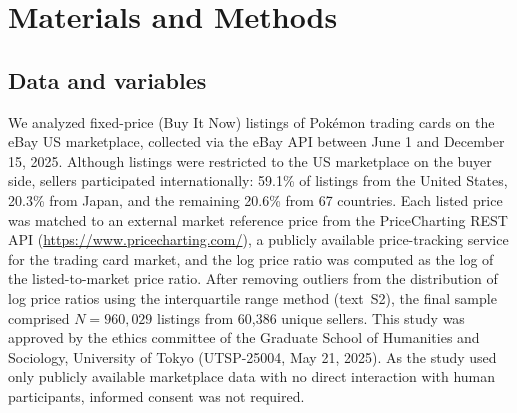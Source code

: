 \documentclass[11pt,letterpaper]{article}
\theoremstyle{definition}
\begin{document}
\section*{Materials and Methods}
\begingroup\sffamily\small\noindent

\subsection*{Data and variables}

We analyzed fixed-price (Buy It Now) listings of Pokémon trading cards on the eBay US marketplace, collected via the eBay API between June 1 and December 15, 2025. Although listings were restricted to the US marketplace on the buyer side, sellers participated internationally: 59.1\% of listings from the United States, 20.3\% from Japan, and the remaining 20.6\% from 67 countries. Each listed price was matched to an external market reference price from the PriceCharting REST API (\url{https://www.pricecharting.com/}), a publicly available price-tracking service for the trading card market, and the log price ratio was computed as the log of the listed-to-market price ratio. After removing outliers from the distribution of log price ratios using the interquartile range method (text~S2), the final sample comprised $N = 960{,}029$ listings from 60{,}386 unique sellers. This study was approved by the ethics committee of the Graduate School of Humanities and Sociology, University of Tokyo (UTSP-25004, May 21, 2025). As the study used only publicly available marketplace data with no direct interaction with human participants, informed consent was not required.
\end{document}
